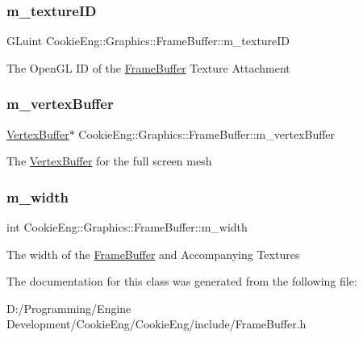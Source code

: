 \subsubsection{\texorpdfstring{m\+\_\+texture\+ID}{m\_textureID}}
{\footnotesize\ttfamily G\+Luint Cookie\+Eng\+::\+Graphics\+::\+Frame\+Buffer\+::m\+\_\+texture\+ID\hspace{0.3cm}{\ttfamily [protected]}}

The Open\+GL ID of the \hyperlink{class_cookie_eng_1_1_graphics_1_1_frame_buffer}{Frame\+Buffer} Texture Attachment \mbox{\label{class_cookie_eng_1_1_graphics_1_1_frame_buffer_aa24abca002f6a2c2bdc97e71cf0e737f}} 
\subsubsection{\texorpdfstring{m\+\_\+vertex\+Buffer}{m\_vertexBuffer}}
{\footnotesize\ttfamily \hyperlink{class_cookie_eng_1_1_graphics_1_1_vertex_buffer}{Vertex\+Buffer}$\ast$ Cookie\+Eng\+::\+Graphics\+::\+Frame\+Buffer\+::m\+\_\+vertex\+Buffer\hspace{0.3cm}{\ttfamily [protected]}}

The \hyperlink{class_cookie_eng_1_1_graphics_1_1_vertex_buffer}{Vertex\+Buffer} for the full screen mesh \mbox{\label{class_cookie_eng_1_1_graphics_1_1_frame_buffer_ac91635b3617b4d7c8bef5a24eafdd7ae}} 
\subsubsection{\texorpdfstring{m\+\_\+width}{m\_width}}
{\footnotesize\ttfamily int Cookie\+Eng\+::\+Graphics\+::\+Frame\+Buffer\+::m\+\_\+width\hspace{0.3cm}{\ttfamily [protected]}}

The width of the \hyperlink{class_cookie_eng_1_1_graphics_1_1_frame_buffer}{Frame\+Buffer} and Accompanying Textures 

The documentation for this class was generated from the following file\+:\begin{DoxyCompactItemize}
\item 
D\+:/\+Programming/\+Engine Development/\+Cookie\+Eng/\+Cookie\+Eng/include/Frame\+Buffer.\+h\end{DoxyCompactItemize}
